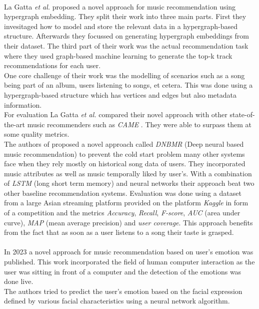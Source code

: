 \documentclass[runningheads,a4paper]{llncs}
\begin{document}
\\
La Gatta \textit{et al.} proposed a novel approach for music recommendation using hypergraph embedding.
They split their work into three main parts.
First they invesitaged how to model and store the relevant data in a hypergraph-based structure.
Afterwards they focussed on generating hypergraph embeddings from their dataset.
The third part of their work was the actual recommendation task where they used graph-based machine learning to 
generate the top-k track recommendations for each user. \\
One core challenge of their work was the modelling of scenarios such as a song being part of an album, users listening to songs, et cetera.
This was done using a hypergraph-based structure which has vertices and edges but also metadata information.\\
For evaluation La Gatta \textit{et al.} compared their novel approach with other state-of-the-art music recommenders such as \textit{CAME} \cite{wang2020came}.
They were able to surpass them at some quality metrics. \cite{la2022music}
\\
The authors of 
\cite{singh2022novel} proposed a novel approach called \textit{DNBMR} (Deep neural based music recommendation) 
to prevent the cold start problem many other systems face when they rely mostly on historical song data of users. 
They incorporated music attributes as well as music temporally liked by user's.
With a combination of \textit{LSTM} (long short term memory) and neural networks their approach beat two other baseline recommendation systems.
Evaluation was done using a dataset from a large Asian streaming platform provided on the platform \textit{Kaggle} in form of a competition and the metrics \textit{Accuracy}, \textit{Recall}, \textit{F-score},
\textit{AUC} (area under curve), \textit{MAP} (mean average precision) and \textit{user coverage}. This approach benefits from the fact that as soon as a user listens to a song their taste is grasped.\\
\\
In 2023 a novel approach for music recommendation based on user's emotion was published. 
This work incorporated the field of human computer interaction as the user 
was sitting in front of a computer and the detection of the emotions was done live. \\
The authors tried to predict the user's emotion based on the facial expression defined by various facial characteristics using a neural network algorithm.\\
\end{document}
